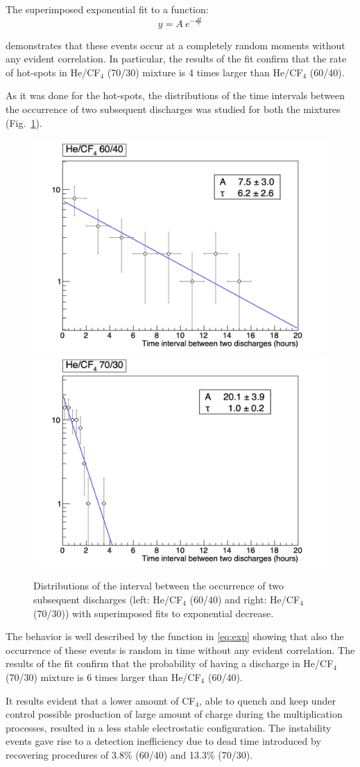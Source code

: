 \documentclass[a4paper,11pt]{article}
\begin{document}
The superimposed exponential fit to a function:
\begin{equation}
\label{eq:exp}
y = A~e^{-\frac{\Delta t}{\tau}}
\end{equation}

demonstrates that these events occur at a completely random moments without any evident correlation. 
In particular, the results of the fit confirm that the rate of hot-spots in He/CF$_4$ (70/30) mixture is 4 times larger than He/CF$_4$ (60/40).

As it was done for the hot-spots, the distributions of the time intervals between the occurrence of two subsequent discharges was studied for both the mixtures (Fig.~\ref{fig:hDistDis}).

\begin{figure}[ht]
	\centering
	\includegraphics[width=0.45\linewidth]{Figures/hDistDis_6040.png}
	\includegraphics[width=0.45\linewidth]{Figures/hDistDis_7030.png}
  	\caption{Distributions of the interval between the occurrence of two subsequent discharges (left: He/CF$_4$ (60/40) and right: He/CF$_4$ (70/30)) with superimposed fits to exponential decrease.}
  	\label{fig:hDistDis}
\end{figure}

The behavior is well described by the function in \ref{eq:exp} showing that also the occurrence of these events is random in time without any evident correlation.
The results of the fit confirm that the probability of having a discharge in He/CF$_4$ (70/30) mixture is 6 times larger than He/CF$_4$ (60/40).

It results evident that a lower amount of CF$_4$, able to quench and keep under control possible production of large amount of charge during the multiplication processes, resulted in a less stable electrostatic configuration. The instability events gave rise to a detection inefficiency due to dead time introduced by recovering procedures of 3.8\% (60/40) and 13.3\% (70/30).
\end{document}
